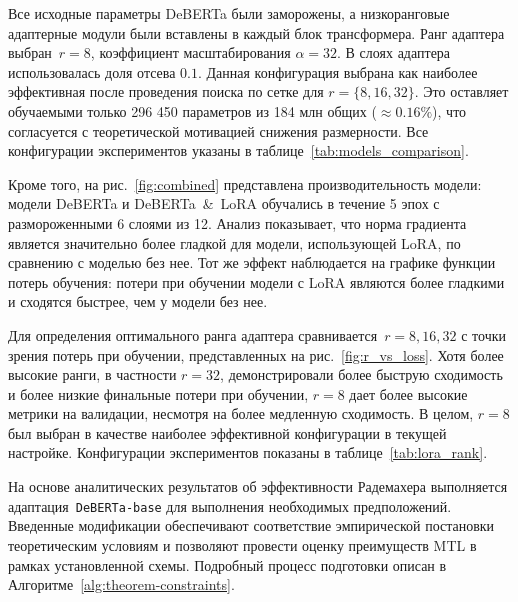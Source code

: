 Все исходные параметры DeBERTa были заморожены, а низкоранговые адаптерные модули были вставлены в каждый блок трансформера.
Ранг адаптера выбран~$r=8$, коэффициент масштабирования $\alpha=32$. В слоях адаптера использовалась доля отсева $0.1$.
Данная конфигурация выбрана как наиболее эффективная после проведения поиска по сетке для $r=\{8, 16, 32\}$.
Это оставляет обучаемыми только 296 450 параметров из 184 млн общих ($\approx0.16\%$), что согласуется с теоретической мотивацией снижения размерности.
Все конфигурации экспериментов указаны в таблице~\ref{tab:models_comparison}.

Кроме того, на рис.~\ref{fig:combined} представлена производительность модели: модели DeBERTa и DeBERTa~\&~LoRA обучались в течение 5 эпох с размороженными 6 слоями из 12.
Анализ показывает, что норма градиента является значительно более гладкой для модели, использующей LoRA, по сравнению с моделью без нее.
Тот же эффект наблюдается на графике функции потерь обучения: потери при обучении модели с LoRA являются более гладкими и сходятся быстрее, чем у модели без нее.

Для определения оптимального ранга адаптера сравнивается~$r=8, 16, 32$ с точки зрения потерь при обучении, представленных на рис.~\ref{fig:r_vs_loss}.
Хотя более высокие ранги, в частности $r=32$, демонстрировали более быструю сходимость и более низкие финальные потери при обучении, $r=8$ дает более высокие метрики на валидации, несмотря на более медленную сходимость.
В целом, $r=8$ был выбран в качестве наиболее эффективной конфигурации в текущей настройке.
Конфигурации экспериментов показаны в таблице~\ref{tab:lora_rank}.

На основе аналитических результатов об эффективности Радемахера выполняется адаптация~\texttt{DeBERTa-base} для выполнения необходимых предположений.
Введенные модификации обеспечивают соответствие эмпирической постановки теоретическим условиям и позволяют провести оценку преимуществ MTL в рамках установленной схемы.
Подробный процесс подготовки описан в Алгоритме~\ref{alg:theorem-constraints}.

